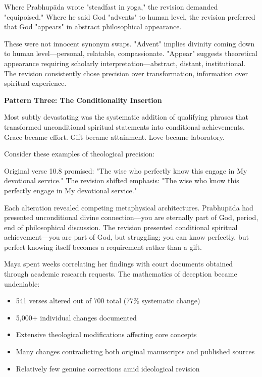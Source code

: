 \documentclass[12pt,twoside]{book}
\begin{document}
Where Prabhupāda wrote "steadfast in yoga," the revision demanded "equipoised." Where he said God "advents" to human level, the revision preferred that God "appears" in abstract philosophical appearance.

These were not innocent synonym swaps. "Advent" implies divinity coming down to human level—personal, relatable, compassionate. "Appear" suggests theoretical appearance requiring scholarly interpretation—abstract, distant, institutional. The revision consistently chose precision over transformation, information over spiritual experience.

\textbf{\textbf{Pattern Three: The Conditionality Insertion}}

Most subtly devastating was the systematic addition of qualifying phrases that transformed unconditional spiritual statements into conditional achievements. Grace became effort. Gift became attainment. Love became laboratory.

Consider these examples of theological precision:

Original verse 10.8 promised: "The wise who perfectly know this engage in My devotional service."  
The revision shifted emphasis: "The wise who know this perfectly engage in My devotional service."

Each alteration revealed competing metaphysical architectures. Prabhupāda had presented unconditional divine connection—you are eternally part of God, period, end of philosophical discussion. The revision presented conditional spiritual achievement—you are part of God, but struggling; you can know perfectly, but perfect knowing itself becomes a requirement rather than a gift.

Maya spent weeks correlating her findings with court documents obtained through academic research requests. The mathematics of deception became undeniable:

\begin{itemize}
\item 541 verses altered out of 700 total (77\% systematic change)
\item 5,000+ individual changes documented
\item Extensive theological modifications affecting core concepts
\item Many changes contradicting both original manuscripts and published sources
\item Relatively few genuine corrections amid ideological revision
\end{itemize}
\end{document}
